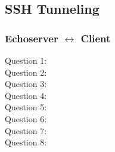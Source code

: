 \subsection{SSH Tunneling}
\subsubsection{{\sc Echoserver} $\leftrightarrow$ {\sc Client}}
\begin{description}
    \item[Question 1:] 
    \item[Question 2:] 
    \item[Question 3:] 
    \item[Question 4:] 
    \item[Question 5:] 
    \item[Question 6:] 
    \item[Question 7:] 
    \item[Question 8:] 
\end{description}
